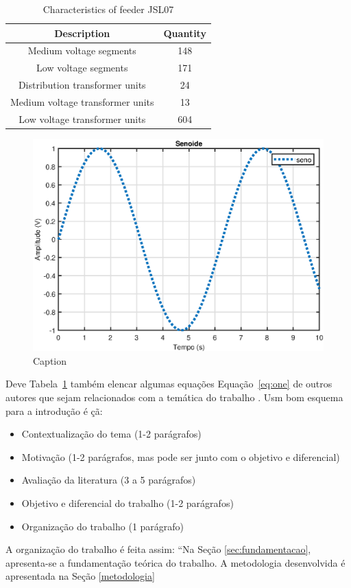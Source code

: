 \begin{table}[H]
  \centering
  \caption{Characteristics of feeder JSL07}
    \begin{tabular}{cc}
    \toprule
    \textbf{Description} & \textbf{Quantity} \\
    \midrule
    Medium voltage segments & 148 \\
    Low voltage segments & 171 \\
    Distribution transformer units & 24 \\
    Medium voltage transformer units & 13 \\
    Low voltage transformer units & 604 \\
    \bottomrule
    \end{tabular}%
  \label{tab:jsl07}%
\end{table}%

\begin{figure}[H]
    \centering
    \includegraphics{teste.eps}
    \caption{Caption}
    \label{fig:enter-label}
\end{figure}

Deve Tabela~\ref{tab:jsl07} também elencar algumas equações Equação~\eqref{eq:one} de outros autores que sejam relacionados com a temática do trabalho \cite{INOUE2011}. 
Usm bom esquema para a introdução é \c{c}\~a:



\begin{itemize}
    \item Contextualização do tema (1-2 parágrafos) \cite{JESSICA2011}
    \item Motivação (1-2 parágrafos, mas pode ser junto com o objetivo e diferencial)
    \item Avaliação da literatura (3 a 5 parágrafos)
    \item Objetivo e diferencial do trabalho (1-2 parágrafos)
    \item Organização do trabalho (1 parágrafo) \cite{Joao2011}
\end{itemize}

A organização do trabalho é feita assim: “Na Seção \ref{sec:fundamentacao}, apresenta-se a fundamentação teórica do trabalho. A metodologia desenvolvida é apresentada na Seção \ref{metodologia}

